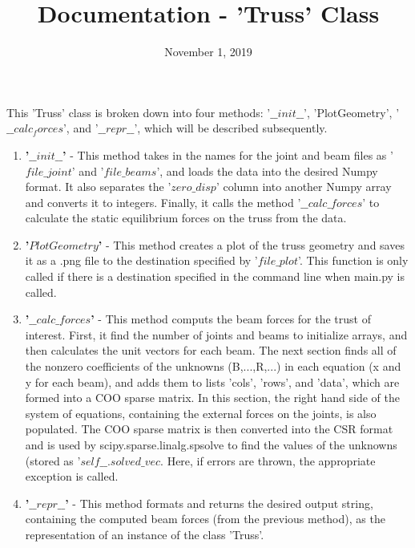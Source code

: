 \documentclass{article}
\begin{document}
\title{Documentation - 'Truss' Class \vspace{-5ex}}
\date{November 1, 2019}
\maketitle
\vspace{-1ex}
	This 'Truss' class is broken down into four methods: '$\_\_init\_\_$', 'PlotGeometry', '$\_\_calc_forces$', and '$\_\_repr\_\_$', which will be described subsequently.
	
\begin{enumerate}
	\item \textbf{'$\_\_init\_\_$'} - This method takes in the names for the joint and beam files as '$file\_joint$' and '$file\_beams$', and loads the data into the desired Numpy format. It also separates the '$zero\_disp$' column into another Numpy array and converts it to integers. Finally, it calls the method '$\_\_calc\_forces$' to calculate the static equilibrium forces on the truss from the data.
	
	\item \textbf{'$PlotGeometry$'} - This method creates a plot of the truss geometry and saves it as a .png file to the destination specified by '$file\_plot$'. This function is only called if there is a destination specified in the command line when main.py is called.
	
	\item \textbf{'$\_\_calc\_forces$'} - This method computs the beam forces for the trust of interest. First, it find the number of joints and beams to initialize arrays, and then calculates the unit vectors for each beam.  The next section finds all of the nonzero coefficients of the unknowns (B,...,R,...) in each equation (x and y for each beam), and adds them to lists 'cols', 'rows', and 'data', which are formed into a COO sparse matrix. In this section, the right hand side of the system of equations, containing the external forces on the joints, is also populated. The COO sparse matrix is then converted into the CSR format and is used by scipy.sparse.linalg.spsolve to find the values of the unknowns (stored as '$self\_\_.solved\_vec$. Here, if errors are thrown, the appropriate exception is called.
	
	\item \textbf{'$\_\_repr\_\_$'} - This method formats and returns the desired output string, containing the computed beam forces (from the previous method), as the representation of an instance of the class 'Truss'.
	
\end{enumerate}
\end{document}
